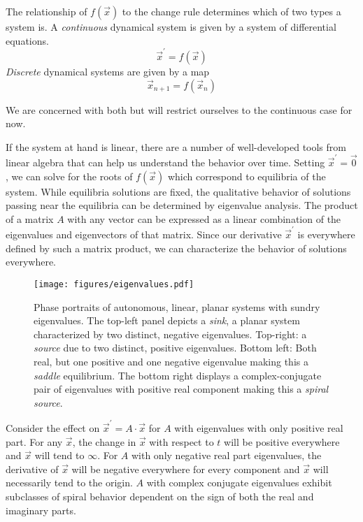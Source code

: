 \documentclass{elsart}
\begin{document}
The relationship of $f(\vec{x})$ to the change rule determines which of two
types a system is.  A \textit{continuous} dynamical system is given by
a system of differential equations.
$$\vec{x}^{\prime} = f(\vec{x})$$
\textit{Discrete} dynamical systems are given by a map
$$\vec{x}_{n+1} = f(\vec{x}_{n})$$

We are concerned with both but will restrict ourselves to the continuous case
for now.

If the system at hand is linear, there are a number of well-developed tools
from linear algebra that can help us understand the behavior over time.
Setting $\vec{x}^{\prime} = \vec{0}$, we can solve for the roots of 
$f(\vec{x})$ which correspond to equilibria of the system.  While 
equilibria solutions are fixed, the qualitative behavior of solutions passing
near the equilibria can be determined by eigenvalue analysis.
The product of a matrix $A$ with any vector can be expressed as a linear combination of the eigenvalues and eigenvectors of that matrix.  Since our 
derivative $\vec{x}^{\prime}$ is everywhere defined by such a matrix product,
we can characterize the behavior of solutions everywhere.

\begin{figure}[htp]
\centering
\texttt{[image: figures/eigenvalues.pdf]}
\caption{Phase portraits of autonomous, linear, planar systems with 
    sundry eigenvalues.
The top-left panel depicts a \textit{sink}, a planar system characterized by two distinct, negative eigenvalues.  Top-right:  a \textit{source} due to two distinct, positive eigenvalues.  Bottom left:  Both real, but one positive and one negative eigenvalue making this a \textit{saddle} equilibrium.  The bottom right displays a complex-conjugate pair of eigenvalues with positive real component making this a \textit{spiral source}.}
\label{fig:eigenvalues}
\end{figure}

Consider the effect on $\vec{x}^{\prime} = A\cdot\vec{x}$ for $A$ with eigenvalues with only positive real part.  For any $\vec{x}$, the change in $\vec{x}$ with respect to $t$ will be positive everywhere
and $\vec{x}$ will tend to $\infty$.  For $A$ with only negative real part eigenvalues, the derivative of $\vec{x}$ will be negative everywhere for every component and $\vec{x}$ will necessarily tend to the origin.  $A$ with complex conjugate eigenvalues exhibit subclasses of spiral behavior dependent on the sign of both the real and imaginary parts.
\end{document}
